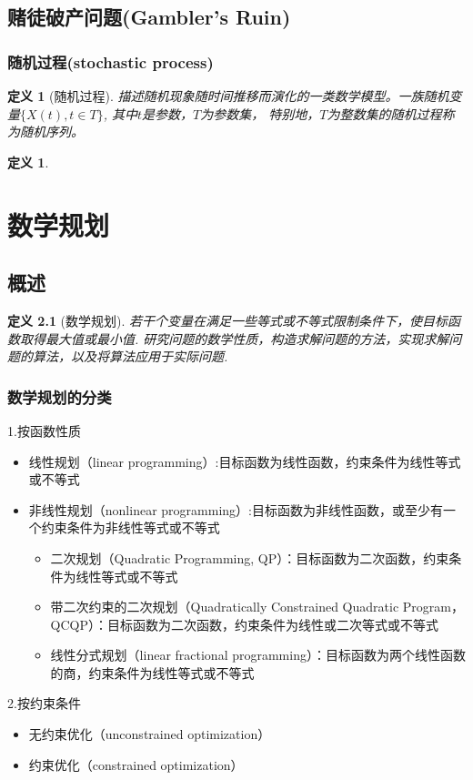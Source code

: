 \documentclass[10t, a4paper, oneside]{ctexbook}
\newtheorem{definition}[theorem]{定义}
\begin{document}
\section{赌徒破产问题(Gambler's Ruin)}
\subsection{随机过程(stochastic process)}
\begin{definition}[随机过程]
    描述随机现象随时间推移而演化的一类数学模型。一族随机变量$\{X(t), t \in T\}$, 其中$t$是参数，$T$为参数集，
    特别地，$T$为整数集的随机过程称为随机序列。
\end{definition}
\begin{definition}
    
\end{definition}
\newpage
\chapter{数学规划}
\section{概述}
\begin{definition}[数学规划]
    若干个变量在满足一些等式或不等式限制条件下，使目标函数取得最大值或最小值.
研究问题的数学性质，构造求解问题的方法，实现求解问题的算法，以及将算法应用于实际问题.
\end{definition}

\subsection{数学规划的分类}
1.按函数性质
\begin{itemize}
    \item 线性规划（linear programming）:目标函数为线性函数，约束条件为线性等式或不等式
    \item 非线性规划（nonlinear programming）:目标函数为非线性函数，或至少有一个约束条件为非线性等式或不等式
    \begin{itemize} 
        \item 二次规划（Quadratic Programming, QP）：目标函数为二次函数，约束条件为线性等式或不等式
        \item 带二次约束的二次规划（Quadratically Constrained Quadratic Program， QCQP）：目标函数为二次函数，约束条件为线性或二次等式或不等式
        \item 线性分式规划（linear fractional programming）：目标函数为两个线性函数的商，约束条件为线性等式或不等式
    \end{itemize}
\end{itemize}
2.按约束条件
\begin{itemize}
    \item 无约束优化（unconstrained optimization）
    \item 约束优化（constrained optimization）
\end{itemize}
\end{document}
